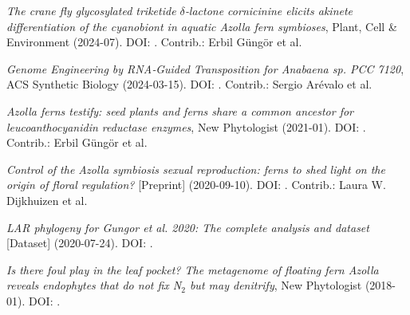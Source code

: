 \documentclass[a4paper,10pt]{article}
\begin{document}
\begin{description}
  \setlength{\itemsep}{0.2em}
  \item \textit{The crane fly glycosylated triketide $\delta$‐lactone cornicinine elicits akinete differentiation of the cyanobiont in aquatic Azolla fern symbioses}, Plant, Cell \& Environment (2024-07). DOI: . Contrib.: Erbil Güngör et al.
  \item \textit{Genome Engineering by RNA‐Guided Transposition for \textit{Anabaena} sp. PCC 7120}, ACS Synthetic Biology (2024-03-15). DOI: . Contrib.: Sergio Arévalo et al.
  \item \textit{Azolla ferns testify: seed plants and ferns share a common ancestor for leucoanthocyanidin reductase enzymes}, New Phytologist (2021-01). DOI: . Contrib.: Erbil Güngör et al.
  \item \textit{Control of the \textit{Azolla} symbiosis sexual reproduction: ferns to shed light on the origin of floral regulation?} [Preprint] (2020-09-10). DOI: . Contrib.: Laura W. Dijkhuizen et al.
  \item \textit{LAR phylogeny for Gungor et al. 2020: The complete analysis and dataset} [Dataset] (2020-07-24). DOI: .
  \item \textit{Is there foul play in the leaf pocket? The metagenome of floating fern \textit{Azolla} reveals endophytes that do not fix N$_2$ but may denitrify}, New Phytologist (2018-01). DOI: .
\end{description}
\end{document}
